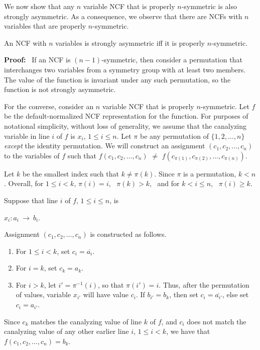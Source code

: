 
We now show that any $n$ variable NCF that is properly $n$-symmetric
is also strongly asymmetric.
As a consequence, we observe that there are NCFs with $n$ variables
that are properly $n$-symmetric.

\begin{theorem}\label{thm:ncf_strong_asymmetry}
An NCF with $n$ variables is strongly asymmetric iff
it is properly $n$-symmetric.
\end{theorem}

\noindent
\textbf{Proof:}~ 
If an NCF is $(n-1)$-symmetric, then consider a permutation that
interchanges two variables from a symmetry group with at least two
members.  The value of the function is invariant under any such
permutation, so the function is not strongly asymmetric.

For the converse, consider an $n$ variable NCF that is properly $n$-symmetric.
Let $f$ be the default-normalized NCF representation for the function.  For
purposes of notational simplicity, without loss of generality,
we assume that the canalyzing
variable in line $i$ of $f$ is $x_i$, $1 \leq i \leq n$.  Let $\pi$
be any permutation of $\{1, 2, \ldots, n\}$ \emph{except} the
identity permutation.  We will construct an assignment $(c_1, c_2,
\ldots,  c_n)$ to the variables of $f$ such that $f(c_1, c_2, \ldots,
c_n)$ $\neq$ $f(c_{\pi(1)}, c_{\pi(2)}, \ldots, c_{\pi(n)})$.

Let $k$ be the smallest index such that $k \neq \pi(k)$.  Since
$\pi$ is a permutation, $k < n$.  Overall, for $1 \leq i < k$,
$\pi(i) = i$,~ $\pi(k) > k$,~ and for $k < i \leq n$,~ $\pi(i) \geq k$.

\smallskip

Suppose that line $i$ of $f$, $1 \leq i \leq n$, is 

\smallskip

\hspace*{0.25in} $x_i : a_i ~\longrightarrow~ b_i$. 

\smallskip

\noindent
Assignment $(c_1, c_2, \ldots,  c_n)$ is constructed as follows.
\begin{enumerate}
\item For $1 \leq i < k$, set $c_i = \overline{a_i}$.  
\item For $i = k$, set $c_k =a_k$. 
\item For $i > k$, let $i' = \pi^{-1}(i)$, so that $\pi(i')
= i$.  Thus, after the permutation of values, variable $x_{i'}$
will have value $c_i$.  If $b_{i'} = b_k$, then set $c_i =
\overline{a_{i'}}$, else set $c_i =  a_{i'}$.
\end{enumerate}
Since $c_k$ matches the canalyzing value of line $k$ of $f$, and
$c_i$ does not match the canalyzing value of any other earlier line
$i$, $1 \leq i < k$, we have that $f(c_1, c_2, \ldots,  c_n) = b_k$.

